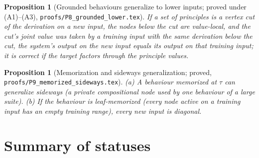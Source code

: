 \documentclass[11pt]{article}
\theoremstyle{definition}
\theoremstyle{plain}
\newtheorem{proposition}[definition]{Proposition}
\theoremstyle{remark}
\begin{document}
\begin{proposition}[Grounded behaviours generalize to lower inputs; proved
under (A1)--(A3), \texttt{proofs/P8\_grounded\_lower.tex}]\label{prop:lower}
If a set of principles is a vertex cut of the derivation on a new input,
the nodes below the cut are value-local, and the cut's joint value was taken
by a training input with the same derivation below the cut, the system's
output on the new input equals its output on that training input; it is
correct if the target factors through the principle values.
\end{proposition}

\begin{proposition}[Memorization and sideways generalization; proved,
\texttt{proofs/P9\_memorized\_sideways.tex}]\label{prop:memoside}
(a) A behaviour memorized at $\tau$ can generalize sideways (a private
compositional node used by one behaviour of a large suite). (b) If the
behaviour is leaf-memorized (every node active on a training input has an
empty training range), every new input is diagonal.
\end{proposition}

\section{Summary of statuses}
\end{document}
